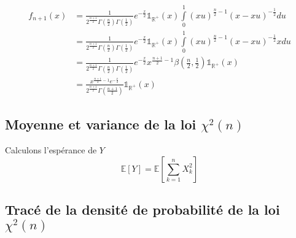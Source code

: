 \documentclass{report}
\begin{document}
			\begin{align*}
				f_{n+1}(x) &= \frac{1}{2^{\frac{n+1}{2}}\Gamma(\frac{n}{2})\Gamma(\frac{1}{2})}e^{-\frac{x}{2}}\mathds{1}_\mathbb{R^+}(x)\int\limits_0^1 (xu)^{\frac{n}{2}-1}(x-xu)^{-\frac{1}{2}}du\\
				&= \frac{1}{2^{\frac{n+1}{2}}\Gamma(\frac{n}{2})\Gamma(\frac{1}{2})}e^{-\frac{x}{2}}\mathds{1}_\mathbb{R^+}(x)\int\limits_0^1 (xu)^{\frac{n}{2}-1}(x-xu)^{-\frac{1}{2}}xdu\\
				&= \frac{1}{2^{\frac{n+1}{2}}\Gamma(\frac{n}{2})\Gamma(\frac{1}{2})}e^{-\frac{x}{2}}x^{\frac{n+1}{2}-1}\beta(\frac{n}{2}, \frac{1}{2})\mathds{1}_\mathbb{R^+}(x)\\
				&= \frac{x^{\frac{n+1}{2}-1}e^{-\frac{x}{2}}}{2^{\frac{n+1}{2}}\Gamma(\frac{n+1}{2})}\mathds{1}_\mathbb{R^+}(x)
			\end{align*}
		\subsection{Moyenne et variance de la loi $\chi^2(n)$}
			Calculons l'espérance de $Y$
			\[ \mathbb{E}[Y] = \mathbb{E}[\sum\limits_{k=1}^n X_k^2] \]
		\subsection{Tracé de la densité de probabilité de la loi $\chi^2(n)$}
\end{document}
